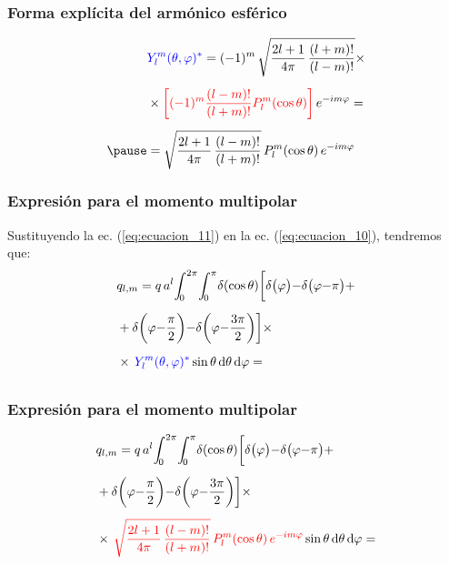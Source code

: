 \documentclass[12pt]{beamer}
\begin{document}
\begin{frame}
\frametitle{Forma explícita del armónico esférico}
\begin{eqnarray}
\begin{aligned}[b]
&\textcolor{blue}{Y_{l}^{m} (\theta, \varphi)^{*}} = (-1)^{m} \, \sqrt{\dfrac{2 l + 1}{4 \pi} \, \dfrac{(l + m)!}{(l - m)!}} \times \\[0.5em]
&\times \textcolor{red}{\bigg[ (-1)^{m} \dfrac{(l - m)!}{(l + m)!} P_{l}^{m} (\cos \theta) \bigg]} \, e^{-i m \varphi} = \\[0.5em] \pause
&= \sqrt{\dfrac{2 l + 1}{4 \pi} \, \dfrac{(l - m)!}{(l + m)!}} \, P_{l}^{m} (\cos \theta) \, e^{-i m \varphi} 
\end{aligned}
\label{eq:ecuacion_11}
\end{eqnarray}
\end{frame}
\begin{frame}
\frametitle{Expresión para el momento multipolar}
Sustituyendo la ec. (\ref{eq:ecuacion_11}) en la ec. (\ref{eq:ecuacion_10}), tendremos que:
\pause
\begin{align*}
&q_{l, m} = q \, a^{l} \scaleint{5ex}_{\bs 0}^{2 \pi} \scaleint{5ex}_{\bs 0}^{\pi} \delta(\cos \theta) \bigg[ \delta \big(\varphi \big) {-} \delta \big(\varphi {-} \pi \big) + \\[0.5em]
&+ \delta \bigg( \varphi {-} \dfrac{\pi}{2} \bigg) {-} \delta \bigg(\varphi {-} \dfrac{3 \pi}{2} \bigg) \bigg] \times \\[0.5em]
&\times \, \textcolor{blue}{Y_{l}^{m} (\theta, \varphi)^{*}} \sin \theta \dd{\theta} \dd{\varphi} = \\[0.5em]
\end{align*}
\end{frame}
\begin{frame}
\frametitle{Expresión para el momento multipolar}
\begin{eqnarray*}
\begin{aligned}
&q_{l, m} = q \, a^{l} \scaleint{5ex}_{\bs 0}^{2 \pi} \scaleint{5ex}_{\bs 0}^{\pi} \delta(\cos \theta) \bigg[ \delta \big(\varphi \big) {-} \delta \big(\varphi {-} \pi \big) + \\[0.5em]
&+ \delta \bigg( \varphi {-} \dfrac{\pi}{2} \bigg) {-} \delta \bigg(\varphi {-} \dfrac{3 \pi}{2} \bigg) \bigg] \times \\[0.5em]
&\times \, \textcolor{red}{\sqrt{\dfrac{2 l + 1}{4 \pi} \, \dfrac{(l - m)!}{(l + m)!}} \, P_{l}^{m} (\cos \theta) \, e^{-i m \varphi}} \sin \theta \dd{\theta} \dd{\varphi} = 
\end{aligned}
\end{eqnarray*}
\end{frame}
\end{document}
